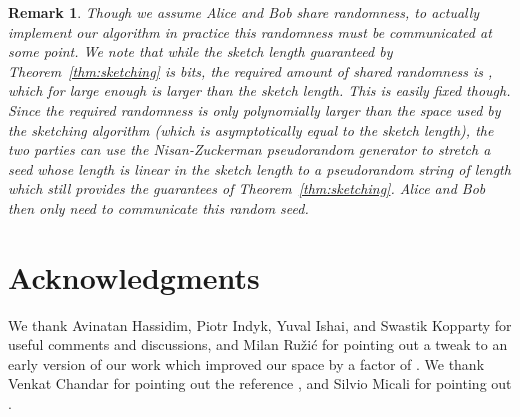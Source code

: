 \documentclass[letterpaper,11pt]{article}
\newcommand{\Theorem}[1]{Theorem~\ref{thm:#1}}
\newtheorem{remark}[theorem]{Remark}
\begin{document}
\begin{remark}
Though we assume Alice and Bob share randomness, to actually implement
our algorithm in practice this randomness must be communicated at some
point.
We note that while the sketch length guaranteed by \Theorem{sketching}
is  bits, the required amount
of shared randomness is , which for large enough 
is larger than the sketch length.  This is easily fixed
though. Since the required randomness is only polynomially larger than
the space used by the sketching algorithm (which is asymptotically equal
to the sketch length), the two parties can use the Nisan-Zuckerman
pseudorandom
generator \cite{NisanZu96} to stretch a seed whose length is linear
  in the sketch length to a pseudorandom string of length
 which still provides the guarantees of
\Theorem{sketching}.  Alice and Bob then only need to communicate this
random seed.
\end{remark}

\section*{Acknowledgments}
We thank Avinatan Hassidim, Piotr Indyk, Yuval Ishai, and Swastik
Kopparty for useful comments and discussions, and Milan Ru\v{z}i\'{c}
for pointing out a tweak to
an early version of our work which improved our space by a factor of
. We thank Venkat Chandar for pointing out the
reference \cite{Wyner74}, and Silvio Micali for pointing out
\cite{BM84}.




\end{document}
